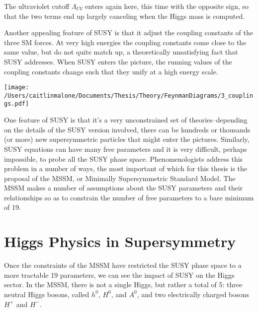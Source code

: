 \documentclass[11pt]{article}
\begin{document}
The ultraviolet cutoff $\Lambda_{UV}$ enters again here, this time with the opposite sign, so that the two terms end up largely canceling when the Higgs mass is computed.  

Another appealing feature of SUSY is that it adjust the coupling constants of the three SM forces.  At very high energies the coupling constants come close to the same value, but do not quite match up, a theoretically unsatisfying fact that SUSY addresses.  When SUSY enters the picture, the running values of the coupling constants change such that they unify at a high energy scale.

\texttt{[image: /Users/caitlinmalone/Documents/Thesis/Theory/FeynmanDiagrams/3\_couplings.pdf]}\label{fig:couplings}

One feature of SUSY is that it's a very unconstrained set of theories--depending on the details of the SUSY version involved, there can be hundreds or thousands (or more) new supersymmetric particles that might enter the pictures.  Similarly, SUSY equations can have many free parameters and it is very difficult, perhaps impossible, to probe all the SUSY phase space.  Phenomenologists address this problem in a number of ways, the most important of which for this thesis is the proposal of the MSSM, or Minimally Supersymmetric Standard Model.  The MSSM makes a number of assumptions about the SUSY parameters and their relationships so as to constrain the number of free parameters to a bare minimum of 19.  

\section{Higgs Physics in Supersymmetry}
Once the constraints of the MSSM have restricted the SUSY phase space to a more tractable 19 parameters, we can see the impact of SUSY on the Higgs sector.  In the MSSM, there is not a single Higgs, but rather a total of 5: three neutral Higgs bosons, called $h^0$, $H^0$, and $A^0$, and two electrically charged bosons $H^+$ and $H^-$.
\end{document}
